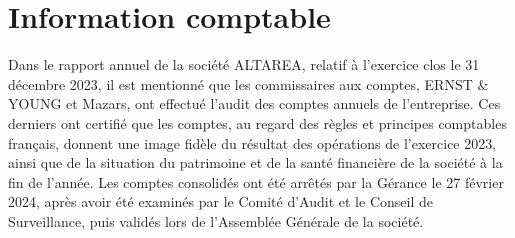 \documentclass[a4paper, 12pt]{report}
\begin{document}
\chapter{Information comptable}
\noindent
Dans le rapport annuel de la société ALTAREA, relatif à l'exercice clos le 31 décembre 2023, il est mentionné que les commissaires aux comptes, ERNST  \& YOUNG et Mazars, ont effectué l'audit des comptes annuels de l'entreprise. 
Ces derniers ont certifié que les comptes, au regard des règles et principes comptables français, donnent une image fidèle du résultat des opérations de l'exercice 2023, ainsi que de la situation du patrimoine et de la santé financière de la société à la fin de l'année. 
Les comptes consolidés ont été arrêtés par la Gérance le 27 février 2024, après avoir été examinés par le Comité d'Audit et le Conseil de Surveillance, puis validés lors de l'Assemblée Générale de la société.
\end{document}
